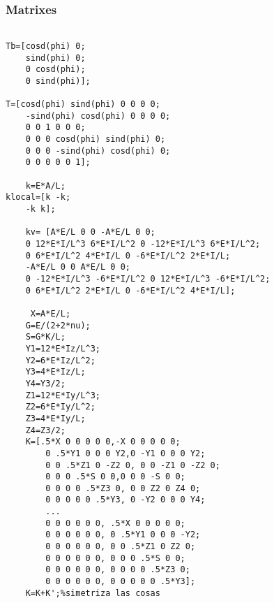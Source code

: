 \subsubsection*{Matrixes}

\begin{code}
\begin{verbatim}

Tb=[cosd(phi) 0;
    sind(phi) 0;
    0 cosd(phi);
    0 sind(phi)];
    
T=[cosd(phi) sind(phi) 0 0 0 0;
    -sind(phi) cosd(phi) 0 0 0 0;
    0 0 1 0 0 0;
    0 0 0 cosd(phi) sind(phi) 0;
    0 0 0 -sind(phi) cosd(phi) 0;
    0 0 0 0 0 1];
    
    k=E*A/L;
klocal=[k -k;
    -k k];
    
    kv= [A*E/L 0 0 -A*E/L 0 0;
    0 12*E*I/L^3 6*E*I/L^2 0 -12*E*I/L^3 6*E*I/L^2;
    0 6*E*I/L^2 4*E*I/L 0 -6*E*I/L^2 2*E*I/L;
    -A*E/L 0 0 A*E/L 0 0;
    0 -12*E*I/L^3 -6*E*I/L^2 0 12*E*I/L^3 -6*E*I/L^2;
    0 6*E*I/L^2 2*E*I/L 0 -6*E*I/L^2 4*E*I/L];
    
     X=A*E/L;
    G=E/(2+2*nu);
    S=G*K/L;
    Y1=12*E*Iz/L^3;
    Y2=6*E*Iz/L^2;
    Y3=4*E*Iz/L;
    Y4=Y3/2;
    Z1=12*E*Iy/L^3;
    Z2=6*E*Iy/L^2;
    Z3=4*E*Iy/L;
    Z4=Z3/2;
    K=[.5*X 0 0 0 0 0,-X 0 0 0 0 0;
        0 .5*Y1 0 0 0 Y2,0 -Y1 0 0 0 Y2;
        0 0 .5*Z1 0 -Z2 0, 0 0 -Z1 0 -Z2 0;
        0 0 0 .5*S 0 0,0 0 0 -S 0 0;
        0 0 0 0 .5*Z3 0, 0 0 Z2 0 Z4 0;
        0 0 0 0 0 .5*Y3, 0 -Y2 0 0 0 Y4;
        ...
        0 0 0 0 0 0, .5*X 0 0 0 0 0;
        0 0 0 0 0 0, 0 .5*Y1 0 0 0 -Y2;
        0 0 0 0 0 0, 0 0 .5*Z1 0 Z2 0;
        0 0 0 0 0 0, 0 0 0 .5*S 0 0;
        0 0 0 0 0 0, 0 0 0 0 .5*Z3 0;
        0 0 0 0 0 0, 0 0 0 0 0 .5*Y3];
    K=K+K';%simetriza las cosas
\end{verbatim}
\end{code}

\egroup